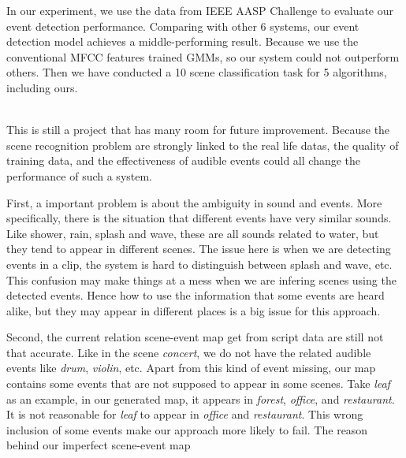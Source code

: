 In our experiment, we use the data from IEEE AASP Challenge to evaluate our event detection performance. 
Comparing with other 6 systems, our event detection model achieves a middle-performing result. 
Because we use the conventional MFCC features trained GMMs, so our system could not outperform others. 
Then we have conducted a 10 scene classification task for 5 algorithms, including ours. 

\\ 

This is still a project that has many room for future improvement. 
Because the scene recognition problem are strongly linked to the real life datas, the quality of training data, and the effectiveness of audible events could all change the performance of such a system. 

First, a important problem is about the ambiguity in sound and events. 
More specifically, there is the situation that different events have very similar sounds. 
Like shower, rain, splash and wave, these are all sounds related to water, but they tend to appear in different scenes. 
The issue here is when we are detecting events in a clip, the system is hard to distinguish between splash and wave, etc. 
This confusion may make things at a mess when we are infering scenes using the detected events. 
Hence how to use the information that some events are heard alike, but they may appear in different places is a big issue for this approach. 

Second, the current relation scene-event map get from script data are still not that accurate. 
Like in the scene \textit{concert}, we do not have the related audible events like \textit{drum}, \textit{violin}, etc. 
Apart from this kind of event missing, our map contains some events that are not supposed to appear in some scenes. 
Take \textit{leaf} as an example, in our generated map, it appears in \textit{forest}, \textit{office}, and \textit{restaurant}. 
It is not reasonable for \textit{leaf} to appear in \textit{office} and \textit{restaurant}. 
This wrong inclusion of some events make our approach more likely to fail. 
The reason behind our imperfect scene-event map 

